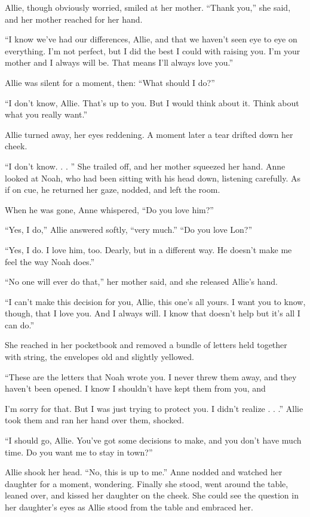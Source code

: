 \documentclass[10pt, twoside, openright]{book}
\begin{document}
Allie, though obviously worried, smiled at her mother. ``Thank you,''
she said, and her mother reached for her hand.

``I know we've had our differences, Allie, and that we haven't seen eye
to eye on everything. I'm not perfect, but I did the best I could with
raising you. I'm your mother and I always will be. That means I'll
always love you.''


Allie was silent for a moment, then: ``What should I do?''


``I don't know, Allie. That's up to you. But I would think about it.
Think about what you really want.''

Allie turned away, her eyes reddening. A moment later a tear drifted
down her cheek.

``I don't know. . . '' She trailed off, and her mother squeezed her
hand. Anne looked at Noah, who had been sitting with his head down,
listening carefully. As if on cue, he returned her gaze, nodded, and
left the room.


When he was gone, Anne whispered, ``Do you love him?''

``Yes, I do,'' Allie answered softly, ``very much.'' ``Do you love
Lon?''


``Yes, I do. I love him, too. Dearly, but in a different way. He doesn't
make me feel the way Noah does.''

``No one will ever do that,'' her mother said, and she released Allie's
hand.

``I can't make this decision for you, Allie, this one's all yours. I
want you to know, though, that I love you. And I always will. I know
that doesn't help but it's all I can do.''

She reached in her pocketbook and removed a bundle of letters held
together with string, the envelopes old and slightly yellowed.

``These are the letters that Noah wrote you. I never threw them away,
and they haven't been opened. I know I shouldn't have kept them from
you, and

I'm sorry for that. But I was just trying to protect you. I didn't
realize . . .'' Allie took them and ran her hand over them, shocked.

``I should go, Allie. You've got some decisions to make, and you don't
have much time. Do you want me to stay in town?''

Allie shook her head. ``No, this is up to me.'' Anne nodded and watched
her daughter for a moment, wondering. Finally she stood, went around the
table, leaned over, and kissed her daughter on the cheek. She could see
the question in her daughter's eyes as Allie stood from the table and
embraced her.
\end{document}
